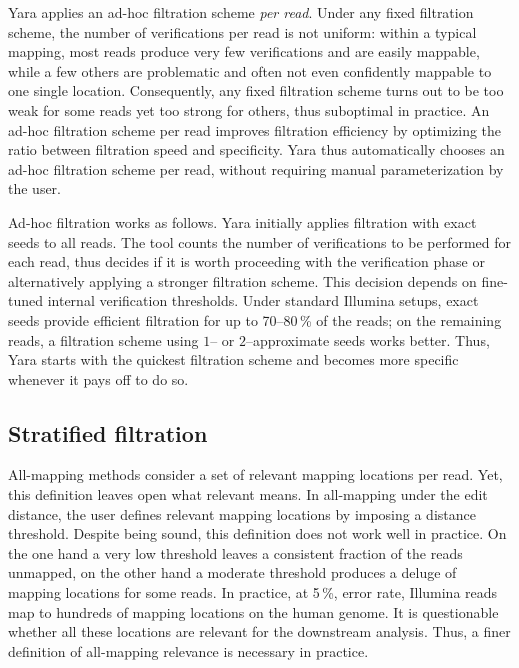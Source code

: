 Yara applies an ad-hoc filtration scheme \emph{per read}.
Under any fixed filtration scheme, the number of verifications per read is not uniform: within a typical mapping, most reads produce very few verifications and are easily mappable, while a few others are problematic and often not even confidently mappable to one single location.
Consequently, any fixed filtration scheme turns out to be too weak for some reads yet too strong for others, thus suboptimal in practice.
An ad-hoc filtration scheme per read improves filtration efficiency by optimizing the ratio between filtration speed and specificity.
Yara thus automatically chooses an ad-hoc filtration scheme per read, without requiring manual parameterization by the user.

Ad-hoc filtration works as follows.
Yara initially applies filtration with exact seeds to all reads.
The tool counts the number of verifications to be performed for each read, thus decides if it is worth proceeding with the verification phase or alternatively applying a stronger filtration scheme.
This decision depends on fine-tuned internal verification thresholds.
Under standard Illumina setups, exact seeds provide efficient filtration for up to 70--80\,\% of the reads; on the remaining reads, a filtration scheme using $1$-- or $2$--approximate seeds works better.
Thus, Yara starts with the quickest filtration scheme and becomes more specific whenever it pays off to do so.


\subsection{Stratified filtration}
\label{sec:yara:eng:strata}

All-mapping methods consider a set of relevant mapping locations per read.
Yet, this definition leaves open what relevant means.
In all-mapping under the edit distance, the user defines relevant mapping locations by imposing a distance threshold.
Despite being sound, this definition does not work well in practice.
On the one hand a very low threshold leaves a consistent fraction of the reads unmapped, on the other hand a moderate threshold produces a deluge of mapping locations for some reads.
In practice, at 5\,\%, error rate, Illumina reads map to hundreds of mapping locations on the human genome.
It is questionable whether all these locations are relevant for the downstream analysis.
Thus, a finer definition of all-mapping relevance is necessary in practice.

